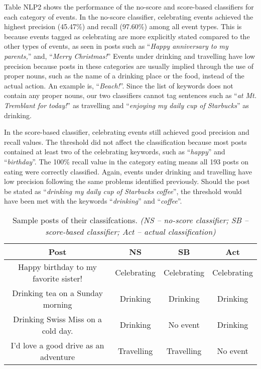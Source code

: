 Table NLP2 shows the performance of the no-score and score-based classifiers for each category of events. In the no-score classifier, celebrating events achieved the highest precision (45.47\%) and recall (97.60\%) among all event types. This is because events tagged as celebrating are more explicitly stated compared to the other types of events, as seen in posts such as ``\textit{Happy anniversary to my parents,}” and, ``\textit{Merry Christmas!}” Events under drinking and travelling have low precision because posts in these categories are usually implied through the use of proper nouns, such as the name of a drinking place or the food, instead of the actual action. An example is, ``\textit{Beach!}”. Since the list of keywords does not contain any proper nouns, our two classifiers cannot tag sentences such as ``\textit{at Mt. Tremblant for today!}” as travelling and ``\textit{enjoying my daily cup of Starbucks}” as drinking. 

In the score-based classifier, celebrating events still achieved good precision and recall values. The threshold did not affect the classification because most posts contained at least two of the celebrating keywords, such as ``\textit{happy}” and ``\textit{birthday}”. The 100\% recall value in the category eating means all 193 posts on eating were correctly classified. Again, events under drinking and travelling have low precision following the same problems identified previously. Should the post be stated as ``\textit{drinking my daily cup of Starbucks coffee}”, the threshold would have been met with the keywords ``\textit{drinking}” and ``\textit{coffee}”. 

\begin{table}[ph!]   %
	\centering
	\caption{Sample posts of their classifcations. \textit{(NS – no-score classifier; SB – score-based classifier; Act – actual classification)}} \vspace{0.25em}
	\begin{tabular}{|c|c|c|c|} \hline
		\centering Post & NS & SB & Act \\ \hline
		Happy birthday to my favorite sister! & Celebrating & Celebrating & Celebrating \\ \hline
		Drinking tea on a Sunday morning & Drinking & Drinking & Drinking \\ \hline
		Drinking Swiss Miss on a cold day. & Drinking & No event & Drinking \\ \hline
		I'd love a good drive as an adventure & Travelling & Travelling & No event \\ \hline
	\end{tabular}
	\label{tab:classification-sampleposts}
\end{table}


